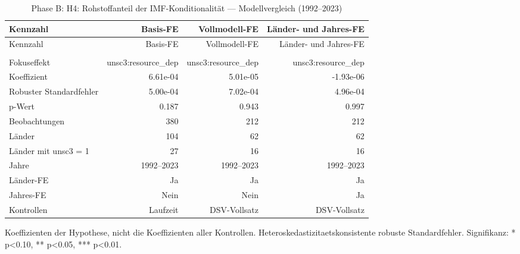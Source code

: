 \begingroup
\scriptsize
\setlength{\tabcolsep}{3pt}
\begin{landscape}
\begin{longtable}{>{\raggedright\arraybackslash}p{4.8cm} r r r}
\caption{Phase B: H4: Rohstoffanteil der IMF-Konditionalität — Modellvergleich (1992–2023)}\label{tab:phase_b_h4_modellvergleich}\\
\toprule
Kennzahl & Basis-FE & Vollmodell-FE & Länder- und Jahres-FE
 \\
\midrule
\endfirsthead
\toprule
Kennzahl & Basis-FE & Vollmodell-FE & Länder- und Jahres-FE
 \\
\midrule
\endhead
\midrule
\multicolumn{4}{r}{Fortsetzung auf der naechsten Seite}\\
\endfoot
\bottomrule
\endlastfoot
Fokuseffekt & unsc3:resource\_dep & unsc3:resource\_dep & unsc3:resource\_dep \\
Koeffizient & 6.61e-04 & 5.01e-05 & -1.93e-06 \\
Robuster Standardfehler & 5.00e-04 & 7.02e-04 & 4.96e-04 \\
p-Wert & 0.187 & 0.943 & 0.997 \\
Beobachtungen & 380 & 212 & 212 \\
Länder & 104 & 62 & 62 \\
Länder mit unsc3 = 1 & 27 & 16 & 16 \\
Jahre & 1992--2023 & 1992--2023 & 1992--2023 \\
Länder-FE & Ja & Ja & Ja \\
Jahres-FE & Nein & Nein & Ja \\
Kontrollen & Laufzeit & DSV-Vollsatz & DSV-Vollsatz \\
\end{longtable}
\noindent\footnotesize Koeffizienten der Hypothese, nicht die Koeffizienten aller Kontrollen. Heteroskedastizitaetskonsistente robuste Standardfehler. Signifikanz: * p<0.10, ** p<0.05, *** p<0.01.\par
\end{landscape}
\endgroup

